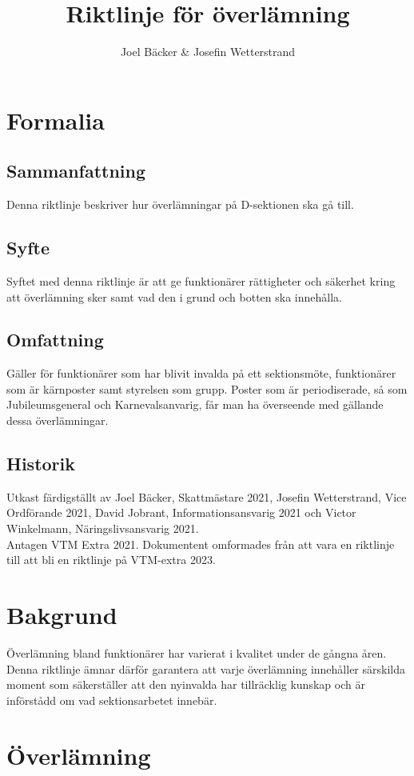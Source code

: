 \documentclass[]{dsekprotokoll}
\title{Riktlinje för överlämning}
\author{Joel Bäcker \& Josefin Wetterstrand}
\begin{document}
\section{Formalia}
\subsection{Sammanfattning}
Denna riktlinje beskriver hur överlämningar på D-sektionen ska gå till.

\subsection{Syfte}
Syftet med denna riktlinje är att ge funktionärer rättigheter och säkerhet kring att överlämning sker samt vad den i grund och botten ska innehålla.

\subsection{Omfattning} %
Gäller för funktionärer som har blivit invalda på ett sektionsmöte, funktionärer som är kärnposter samt styrelsen som grupp. Poster som är periodiserade, så som Jubileumsgeneral och Karnevalsanvarig, får man ha överseende med gällande dessa överlämningar.

\subsection{Historik}
Utkast färdigställt av Joel Bäcker, Skattmästare 2021, Josefin Wetterstrand, Vice Ordförande 2021, David Jobrant, Informationsansvarig 2021 och Victor Winkelmann, Näringslivsansvarig 2021.
\\ Antagen VTM Extra 2021. Dokumentent omformades från att vara en riktlinje till att bli en riktlinje på VTM-extra 2023.
\section{Bakgrund}
Överlämning bland funktionärer har varierat i kvalitet under de gångna åren. Denna riktlinje ämnar därför garantera att varje överlämning innehåller särskilda moment som säkerställer att den nyinvalda har tillräcklig kunskap och är införstådd om vad sektionsarbetet innebär.

\section{Överlämning}
\end{document}

